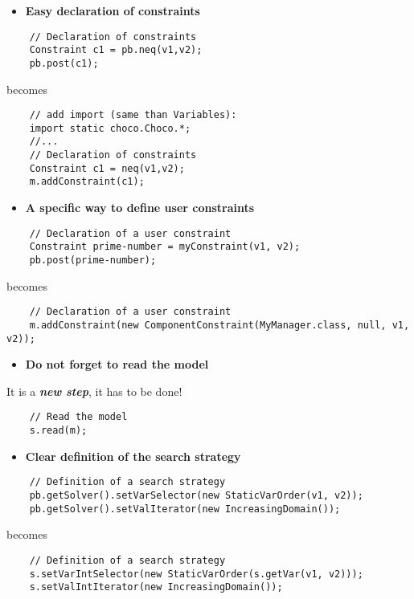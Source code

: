 \begin{itemize}
	\item \textbf{Easy declaration of constraints}
\end{itemize}

\begin{lstlisting}
	// Declaration of constraints
	Constraint c1 = pb.neq(v1,v2);
	pb.post(c1);
\end{lstlisting}
becomes
\begin{lstlisting}
	// add import (same than Variables):
	import static choco.Choco.*;
	//...
	// Declaration of constraints
	Constraint c1 = neq(v1,v2);
	m.addConstraint(c1);
\end{lstlisting}

\begin{itemize}
	\item \textbf{A specific way to define user constraints}
\end{itemize}

\begin{lstlisting}
	// Declaration of a user constraint
	Constraint prime-number = myConstraint(v1, v2);
	pb.post(prime-number);
\end{lstlisting}
becomes
\begin{lstlisting}
	// Declaration of a user constraint
	m.addConstraint(new ComponentConstraint(MyManager.class, null, v1, v2));
\end{lstlisting}

\begin{itemize}
	\item \textbf{Do not forget to read the model}
\end{itemize}

It is a \emph{\textbf{new step}}, it has to be done! 
\begin{lstlisting}
	// Read the model
	s.read(m);
\end{lstlisting}

\begin{itemize}
	\item \textbf{Clear definition of the search strategy}
\end{itemize}

\begin{lstlisting}
	// Definition of a search strategy
	pb.getSolver().setVarSelector(new StaticVarOrder(v1, v2));
	pb.getSolver().setValIterator(new IncreasingDomain());
\end{lstlisting}
becomes
\begin{lstlisting}
	// Definition of a search strategy
	s.setVarIntSelector(new StaticVarOrder(s.getVar(v1, v2)));
	s.setValIntIterator(new IncreasingDomain());
\end{lstlisting}

